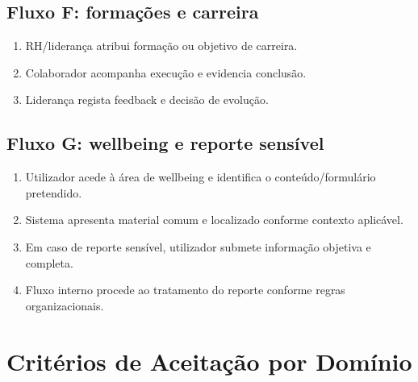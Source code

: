 \documentclass[11pt,a4paper,twoside]{article}
\begin{document}
\subsection{Fluxo F: formações e carreira}
\begin{enumerate}
  \item RH/liderança atribui formação ou objetivo de carreira.
  \item Colaborador acompanha execução e evidencia conclusão.
  \item Liderança regista feedback e decisão de evolução.
\end{enumerate}

\subsection{Fluxo G: wellbeing e reporte sensível}
\begin{enumerate}
  \item Utilizador acede à área de wellbeing e identifica o conteúdo/formulário pretendido.
  \item Sistema apresenta material comum e localizado conforme contexto aplicável.
  \item Em caso de reporte sensível, utilizador submete informação objetiva e completa.
  \item Fluxo interno procede ao tratamento do reporte conforme regras organizacionais.
\end{enumerate}

\section{Critérios de Aceitação por Domínio}
\end{document}
